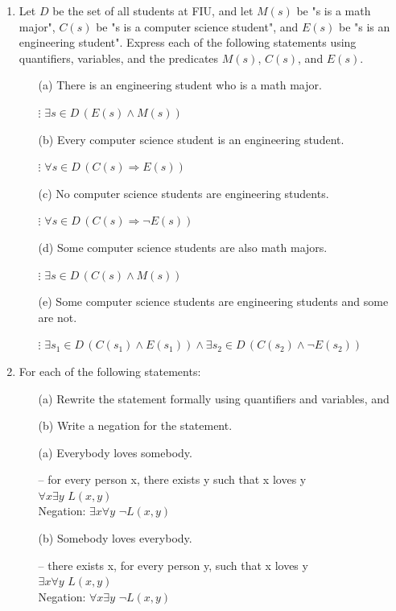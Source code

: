 \documentclass{article}
\begin{document}
\begin{enumerate}
		
		\item Let $D$ be the set of all students at FIU, and let $M(s)$ be "s is a math major", $C(s)$ be "s is a computer science student", and $E(s)$ be "s is an engineering student". Express each of the following statements using quantifiers, variables, and the predicates $M(s)$, $C(s)$, and $E(s)$.
		\begin{itemize}
			\item[(a)] There is an engineering student who is a math major.
			\item[$\vdots$] \(\exists s \in D \, (E(s) \land M(s))\)
			\item[(b)] Every computer science student is an engineering student.
			\item[$\vdots$] \(\forall s \in D \, (C(s) \Rightarrow E(s))\)
			
			\item[(c)] No computer science students are engineering students.
			\item[$\vdots$] \(\forall s \in D \, (C(s) \Rightarrow \neg E(s))\)
			
			\item[(d)] Some computer science students are also math majors.
			\item[$\vdots$] \(\exists s \in D \, (C(s) \land M(s))\)
			
			\item[(e)] Some computer science students are engineering students and some are not.
			\item[$\vdots$] \(\exists s_1 \in D \, (C(s_1) \land E(s_1)) \land \exists s_2 \in D \, (C(s_2) \land \neg E(s_2))\)
			
		\end{itemize}
		
		\item For each of the following statements:
		\begin{itemize}
			\item[(a)] Rewrite the statement formally using quantifiers and variables, and
			\item[(b)] Write a negation for the statement.
		\end{itemize}
		\begin{itemize}
			\item[(a)] Everybody loves somebody.
			\item[--] for every person x, there exists y such that x loves y \\
					$\forall x \exists y$  $L(x,y)$ \\
					Negation: $\exists x \forall y$ $\neg L(x,y)$ \\ 
					
			\item[(b)] Somebody loves everybody.
			\item[--] there exists x, for every person y, such that x loves y \\
					$\exists x \forall y$ $L(x,y)$ \\ 
					Negation: $\forall x \exists y$ $ \neg L(x,y)$
		\end{itemize}
	\end{enumerate}
	
\end{document}
